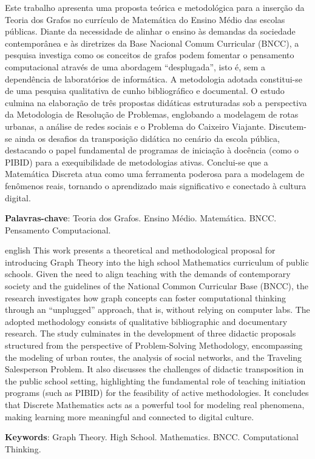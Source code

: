 \documentclass[
  12pt,
  oneside,
  a4paper,
  english,
  brazilian
  ]{abntex2}
\theoremstyle{definition}
\def\\{ }%
\def\vspace#1{ }%
\begin{document}
\begin{resumo}
 Este trabalho apresenta uma proposta teórica e metodológica para a inserção da Teoria dos Grafos no currículo de Matemática do Ensino Médio das escolas públicas. Diante da necessidade de alinhar o ensino às demandas da sociedade contemporânea e às diretrizes da Base Nacional Comum Curricular (BNCC), a pesquisa investiga como os conceitos de grafos podem fomentar o pensamento computacional através de uma abordagem ``desplugada'', isto é, sem a dependência de laboratórios de informática. A metodologia adotada constitui-se de uma pesquisa qualitativa de cunho bibliográfico e documental. O estudo culmina na elaboração de três propostas didáticas estruturadas sob a perspectiva da Metodologia de Resolução de Problemas, englobando a modelagem de rotas urbanas, a análise de redes sociais e o Problema do Caixeiro Viajante. Discutem-se ainda os desafios da transposição didática no cenário da escola pública, destacando o papel fundamental de programas de iniciação à docência (como o PIBID) para a exequibilidade de metodologias ativas. Conclui-se que a Matemática Discreta atua como uma ferramenta poderosa para a modelagem de fenômenos reais, tornando o aprendizado mais significativo e conectado à cultura digital.
 \vspace{\onelineskip}
 \noindent \\
 \textbf{Palavras-chave}: Teoria dos Grafos. Ensino Médio. Matemática. BNCC. Pensamento Computacional.
 \end{resumo}

\begin{resumo}[Abstract]
 \begin{otherlanguage*}{english}
   This work presents a theoretical and methodological proposal for introducing Graph Theory into the high school Mathematics curriculum of public schools. Given the need to align teaching with the demands of contemporary society and the guidelines of the National Common Curricular Base (BNCC), the research investigates how graph concepts can foster computational thinking through an ``unplugged'' approach, that is, without relying on computer labs. The adopted methodology consists of qualitative bibliographic and documentary research. The study culminates in the development of three didactic proposals structured from the perspective of Problem-Solving Methodology, encompassing the modeling of urban routes, the analysis of social networks, and the Traveling Salesperson Problem. It also discusses the challenges of didactic transposition in the public school setting, highlighting the fundamental role of teaching initiation programs (such as PIBID) for the feasibility of active methodologies. It concludes that Discrete Mathematics acts as a powerful tool for modeling real phenomena, making learning more meaningful and connected to digital culture.
 \vspace{\onelineskip}
   \noindent \\
   \textbf{Keywords}: Graph Theory. High School. Mathematics. BNCC. Computational Thinking.
 \end{otherlanguage*}
\end{resumo}
\end{document}
